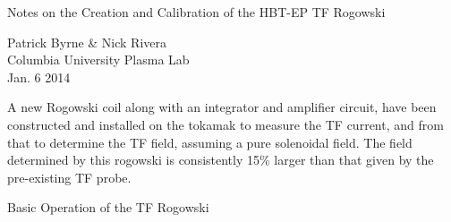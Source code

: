 \documentclass{article}
\begin{document}
\begin{center}
\begin{LARGE}
Notes on the Creation and Calibration of the HBT-EP TF Rogowski\\
\end{LARGE}
\begin{large}
\vspace{0.25 in}
Patrick Byrne \& Nick Rivera\\
Columbia University Plasma Lab\\
Jan. 6 2014\\
\end{large}
\end{center}
\vspace{0.25 in}
\begin{large}
\par
A new Rogowski coil along with an integrator and amplifier circuit, have been constructed and installed on the tokamak to measure the TF current, and from that to determine the TF field, assuming a pure solenoidal field.  The field determined by this rogowski is consistently 15\% larger than that given by the pre-existing TF probe.
\end{large}
\vspace{0.25in}
\begin{center}
\begin{LARGE}
Basic Operation of the TF Rogowski
\end{LARGE}
\end{center}
\par
\end{document}
